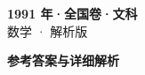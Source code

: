 \documentclass[zihao=-4, a4paper]{ctexart}
\begin{document}
\begin{center}
  {\Large\bfseries 1991 年·全国卷·文科}\\[4pt]
  {\large 数学 · 解析版}
\end{center}
\medskip
{}

\clearpage
{}
\begin{center}{\Large\bfseries 参考答案与详细解析}\end{center}
\medskip

\end{document}
